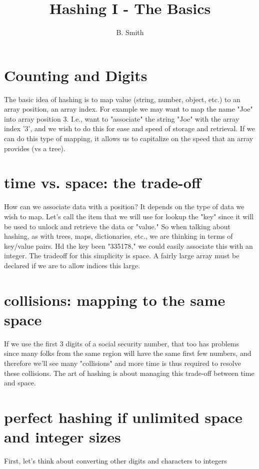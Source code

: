 \documentclass[11pt]{article} %
\title{Hashing I - The Basics}
\author{B. Smith}
\begin{document}
\maketitle

\section{Counting and Digits}


The basic idea of hashing is to map value (string, number, object, etc.) to an array position, an array index.  For example we may want to map the name "Joe" into array position  3.  I.e., want to "associate"  the string "Joe" with the array index '3', and we wish to do this for ease and speed of storage and retrieval.  If we can do this type of mapping, it allows us to capitalize on the speed that an array provides (vs a tree).

\section{time vs. space: the trade-off}
How can we associate data with a position?  It depends on the type of data we wish to map.  Let's call the item that we will use for lookup the "key" since it will be used to unlock and retrieve the data or "value."  So when talking about hashing, as with trees, maps, dictionaries, etc., we are thinking in terms of key/value pairs.  Hd the key been  "335178," we could easily associate this with an integer.  The tradeoff for this simplicity is space.  A fairly large array must be declared if we are to allow indices this large.

\section{collisions: mapping to the same space}
If we use the first 3 digits of a social security number, that too has problems since many folks from the same region will have the same first few numbers, and therefore we'll see many "collisions" and more time is thus required to resolve these collisions.
The art of hashing is about managing this trade-off between time and space.

\section{perfect hashing if unlimited space and integer sizes}
First, let's think about converting other digits and characters to integers
\end{document}
